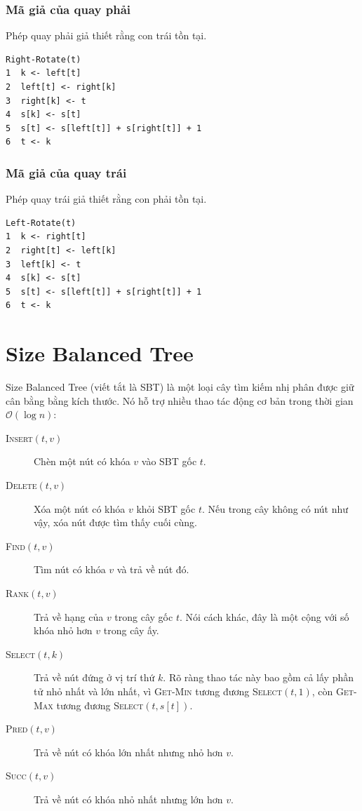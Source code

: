 \documentclass[11pt]{article}
\newcommand{\Oh}{\mathcal{O}}
\begin{document}
\subsubsection{Mã giả của quay phải}

Phép quay phải giả thiết rằng con trái tồn tại.

\begin{verbatim}
Right-Rotate(t)
1  k <- left[t]
2  left[t] <- right[k]
3  right[k] <- t
4  s[k] <- s[t]
5  s[t] <- s[left[t]] + s[right[t]] + 1
6  t <- k
\end{verbatim}

\subsubsection{Mã giả của quay trái}

Phép quay trái giả thiết rằng con phải tồn tại.

\begin{verbatim}
Left-Rotate(t)
1  k <- right[t]
2  right[t] <- left[k]
3  left[k] <- t
4  s[k] <- s[t]
5  s[t] <- s[left[t]] + s[right[t]] + 1
6  t <- k
\end{verbatim}

\section{Size Balanced Tree}

Size Balanced Tree (viết tắt là SBT) là một loại cây tìm kiếm nhị phân được
giữ cân bằng bằng kích thước. Nó hỗ trợ nhiều thao tác động cơ bản trong thời
gian $\Oh(\log n)$:

\begin{description}
  \item[\textsc{Insert}$(t,v)$] Chèn một nút có khóa $v$ vào SBT gốc $t$.
  \item[\textsc{Delete}$(t,v)$] Xóa một nút có khóa $v$ khỏi SBT gốc $t$.
  Nếu trong cây không có nút như vậy, xóa nút được tìm thấy cuối cùng.
  \item[\textsc{Find}$(t,v)$] Tìm nút có khóa $v$ và trả về nút đó.
  \item[\textsc{Rank}$(t,v)$] Trả về hạng của $v$ trong cây gốc $t$. Nói cách
  khác, đây là một cộng với số khóa nhỏ hơn $v$ trong cây ấy.
  \item[\textsc{Select}$(t,k)$] Trả về nút đứng ở vị trí thứ $k$. Rõ ràng thao
  tác này bao gồm cả lấy phần tử nhỏ nhất và lớn nhất, vì
  \textsc{Get-Min} tương đương \textsc{Select}$(t,1)$, còn \textsc{Get-Max}
  tương đương \textsc{Select}$(t,s[t])$.
  \item[\textsc{Pred}$(t,v)$] Trả về nút có khóa lớn nhất nhưng nhỏ hơn $v$.
  \item[\textsc{Succ}$(t,v)$] Trả về nút có khóa nhỏ nhất nhưng lớn hơn $v$.
\end{description}
\end{document}
